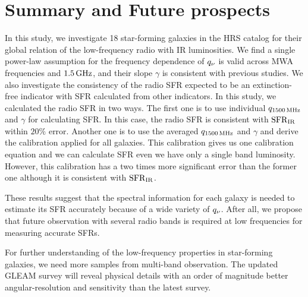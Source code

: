 \chapter{Summary and Future prospects}\label{chap:summary}
%
%

In this study, we investigate 18 star-forming galaxies in the HRS catalog for their global relation of the low-frequency radio with IR luminosities.
We find a single power-law assumption for the frequency dependence of $q_{\nu}$ is valid across MWA frequencies and $1.5\,\mathrm{GHz}$, and their slope $\gamma$ is consistent with previous studies.
We also investigate the consistency of the radio SFR expected to be an extinction-free indicator with SFR calculated from other indicators.
In this study, we calculated the radio SFR in two ways.
The first one is to use individual $q_{\mathrm{1500\,\mathrm{MHz}}}$ and $\gamma$ for calculating SFR.
In this case, the radio SFR is consistent with $\mathrm{SFR}_{\mathrm{IR}}$ within $20\%$ error.
Another one is to use the averaged $q_{\mathrm{1500\,\mathrm{MHz}}}$ and $\gamma$ and derive the calibration applied for all galaxies.
This calibration gives us one calibration equation and we can calculate SFR even we have only a single band luminosity.
However, this calibration has a two times more significant error than the former one although it is consistent with $\mathrm{SFR}_{\mathrm{IR}}$.

These results suggest that the spectral information for each galaxy is needed to estimate its SFR accurately because of a wide variety of $q_{\nu}$.
After all, we propose that future observation with several radio bands is required at low frequencies for measuring accurate SFRs.

For further understanding of the low-frequency properties in star-forming galaxies, we need more samples from multi-band observation.
The updated GLEAM survey will reveal physical details with an order of magnitude better angular-resolution and sensitivity than the latest survey.
